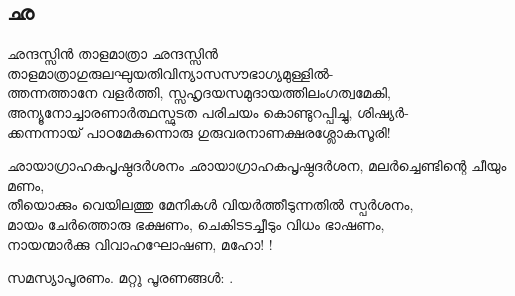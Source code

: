\subsection{ഛ}
\begin{enumerate}

\begin{slokam}{\VSr}{\VKG}{ഛന്ദസ്സിൻ താളമാത്രാ}
ഛന്ദസ്സിൻ താളമാത്രാഗുരുലഘുയതിവിന്യാസസൗഭാഗ്യമുള്ളിൽ-\\
ത്തന്നത്താനേ വളർത്തി, സ്സഹൃദയസമുദായത്തിലംഗത്വമേകി,\\
അന്യൂനോച്ചാരണാർത്ഥസ്ഫുടത പരിചയം കൊണ്ടുറപ്പിച്ചു, ശിഷ്യർ-\\
ക്കന്നന്നായ്‌ പാഠമേകുന്നൊരു ഗുരുവരനാണക്ഷരശ്ലോകസൂരി!
\end{slokam}



\begin{slokam}{\VSv}{\UN}{ഛായാഗ്രാഹകപൃഷ്ഠദർശനം} 
ഛായാഗ്രാഹകപൃഷ്ഠദർശന, മലർച്ചെണ്ടിന്റെ ചീയും മണം,\\
തീയൊക്കും വെയിലത്തു മേനികള്‍ വിയർത്തീടുന്നതിൽ  സ്പർശനം,\\
മായം ചേർത്തൊരു ഭക്ഷണം, ചെകിടടച്ചീടും വിധം ഭാഷണം,\\
നായന്മാർക്കു വിവാഹഘോഷണ, മഹോ! !
\end{slokam}



സമസ്യാപൂരണം. മറ്റു പൂരണങ്ങൾ: .



\end{enumerate}


